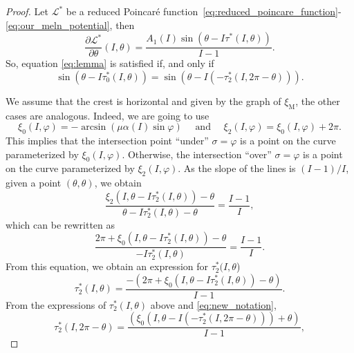 \documentclass[a4paper,10pt]{article}
\newcommand{\M}{\text{M}}
\newcommand{\NH}{\text{NHIM}}
\newcommand{\zeroM}{\text{0}}
\newcommand{\oneM}{\text{2}}
\theoremstyle{definition}
\begin{document}
\begin{proof}
Let $\mathcal{L}^*$ be a reduced Poincar\'{e} function~\eqref{eq:reduced_poincare_function}-\eqref{eq:our_meln_potential}, then
\begin{equation*}
\frac{\partial\mathcal{L}^*}{\partial\theta}\left(I,\theta\right) = \frac{A_1(I)\sin(\theta - I\tau^*(I,\theta))}{I-1}.\label{eq:diff_L__d_theta}
\end{equation*}
So, equation \eqref{eq:lemma} is satisfied if, and only if
\begin{equation}
\sin(\theta - I\tau_{\zeroM}^*(I,\theta)) = \sin(\theta -I(-\tau_{\oneM}^*(I,2\pi-\theta))).\label{eq:equi_lemma}
\end{equation}

We assume that the crest is horizontal and given by the graph of $\xi_{\M}$, the other cases are analogous.
Indeed, we are going to use
\begin{equation}
\xi_{\zeroM}(I,\varphi) = -\arcsin(\mu\alpha(I)\sin\varphi)\quad \text{ and }\quad \xi_{\oneM}(I,\varphi) = \xi_{\zeroM}(I,\varphi) + 2\pi.\label{eq:new_notation}
\end{equation}
This implies that the intersection point ``under'' $\sigma = \varphi$ is a point on the curve parameterized by $\xi_{\zeroM}(I,\varphi)$.
Otherwise, the intersection ``over'' $\sigma = \varphi $ is a point on the curve parameterized by $\xi_{\oneM}(I,\varphi)$.
As the slope of the {\NH} lines is $(I-1)/I$, given a point $(\theta,\theta)$, we obtain
\begin{equation*}
\frac{\xi_{\oneM}(I,\theta-I\tau_{\oneM}^*(I,\theta)) - \theta}{\theta - I\tau_{\oneM}^*(I,\theta) - \theta} = \frac{I-1}{I},
\end{equation*}
which can be rewritten as
\begin{equation*}
\frac{2\pi + \xi_{\zeroM}(I,\theta - I\tau_{\oneM}^*(I,\theta))- \theta}{- I\tau_{\oneM}^*(I,\theta)} = \frac{I-1}{I}.
\end{equation*}
From this equation, we obtain an expression for $\tau_{\oneM}^*(I,\theta$)
\begin{equation*}
\tau_{\oneM}^*(I,\theta) = \frac{-\left(2\pi + \xi_{\zeroM}(I,\theta - I\tau_{\oneM}^*(I,\theta)) - \theta\right)}{I-1}.
\end{equation*}
From the expressions of $\tau_{\oneM}^*(I,\theta)$ above and \eqref{eq:new_notation},
\begin{equation*}
\tau_{\oneM}^*(I,2\pi-\theta)= \frac{\left(\xi_{\zeroM}(I, \theta -I\left(- \tau_{\oneM}^*(I,2\pi -\theta)\right))+ \theta\right)}{I-1},

\end{equation*}
\end{proof}
\end{document}
